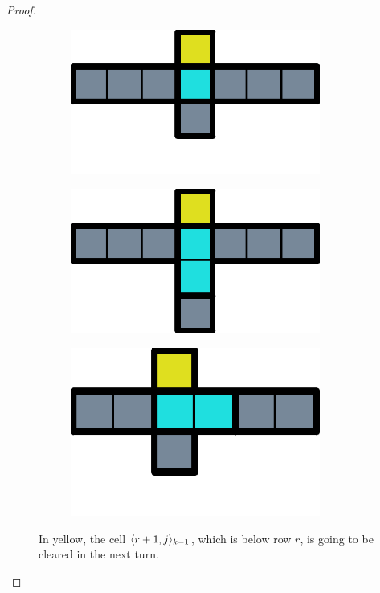 \begin{proof}
\begin{figure}[ht]
  \centering
  \begin{subfigure}[b]{0.15\textwidth}
    \centering
    \includegraphics[width=0.9\textwidth]{./pictures/dominoes/proff-floating/scenario-1.pdf}
    \caption{}
    \label{floating:a}
  \end{subfigure}
  \begin{subfigure}[b]{0.15\textwidth}
    \centering
    \includegraphics[width=0.9\textwidth]{./pictures/dominoes/proff-floating/scenario-2.pdf}
    \caption{}
    \label{floating:b}
  \end{subfigure}
  \begin{subfigure}[b]{0.15\textwidth}
    \centering
    \includegraphics[width=0.9\textwidth]{./pictures/dominoes/proff-floating/scenario-3.pdf}
    \caption{}
    \label{floating:c}
  \end{subfigure}
  \caption{In yellow, the cell \( \cell[r+1][j]_{k-1} \), which is below row \( r \), is going to be cleared in the next turn.}
  \label{dom:drs}
\end{figure}


\end{proof}
